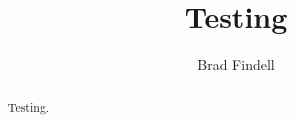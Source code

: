 \documentclass[numbers,nooutcomes,twoside,hints]{xourse}
\title{Testing}
\author{Brad Findell}
\begin{document}
\begin{abstract}
Testing. 
\end{abstract}
\maketitle


\end{document}
